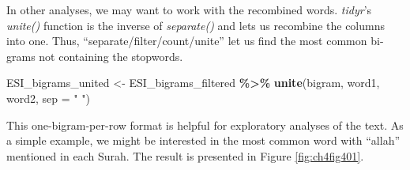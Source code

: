 \documentclass[
]{article}
\newenvironment{Shaded}{\begin{snugshade}}{\end{snugshade}}
\newcommand{\AttributeTok}[1]{\textcolor[rgb]{0.13,0.29,0.53}{#1}}
\newcommand{\ConstantTok}[1]{\textcolor[rgb]{0.56,0.35,0.01}{#1}}
\newcommand{\FunctionTok}[1]{\textcolor[rgb]{0.13,0.29,0.53}{\textbf{#1}}}
\newcommand{\NormalTok}[1]{#1}
\newcommand{\OtherTok}[1]{\textcolor[rgb]{0.56,0.35,0.01}{#1}}
\newcommand{\SpecialCharTok}[1]{\textcolor[rgb]{0.81,0.36,0.00}{\textbf{#1}}}
\newcommand{\StringTok}[1]{\textcolor[rgb]{0.31,0.60,0.02}{#1}}
\begin{document}
\begin{Shaded}
\end{Shaded}

\normalsize

In other analyses, we may want to work with the recombined words. \emph{tidyr}'s \emph{unite()} function is the inverse of \emph{separate()} and lets us recombine the columns into one. Thus, ``separate/filter/count/unite'' let us find the most common bi-grams not containing the stopwords.

\footnotesize

\begin{Shaded}
\begin{Highlighting}[]
\NormalTok{ESI\_bigrams\_united }\OtherTok{\textless{}{-}}\NormalTok{ ESI\_bigrams\_filtered }\SpecialCharTok{\%\textgreater{}\%}
  \FunctionTok{unite}\NormalTok{(bigram, word1, word2, }\AttributeTok{sep =} \StringTok{" "}\NormalTok{)}
\end{Highlighting}
\end{Shaded}

\normalsize

This one-bigram-per-row format is helpful for exploratory analyses of the text. As a simple example, we might be interested in the most common word with ``allah'' mentioned in each Surah. The result is presented in Figure \ref{fig:ch4fig401}.
\end{document}
